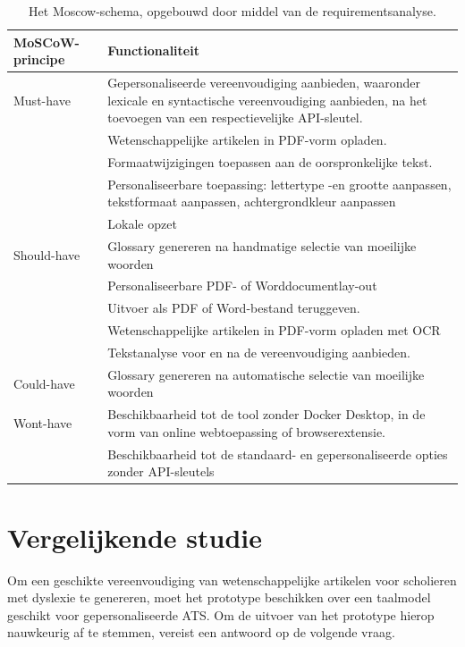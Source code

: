 \begin{center}
	\begin{table}[H]
	\begin{tabular}{ | m{4cm} | m{11cm} | } 
		\hline
		\textbf{MoSCoW-principe} & Functionaliteit \\
		\hline
		Must-have & Gepersonaliseerde vereenvoudiging aanbieden, waaronder lexicale en syntactische vereenvoudiging aanbieden, na het toevoegen van een respectievelijke API-sleutel. \\
		& Wetenschappelijke artikelen in PDF-vorm opladen. \\
		& Formaatwijzigingen toepassen aan de oorspronkelijke tekst. \\
		& Personaliseerbare toepassing: lettertype -en grootte aanpassen, tekstformaat aanpassen, achtergrondkleur aanpassen \\
		& Lokale opzet \\
		\hline
		Should-have & Glossary genereren na handmatige selectie van moeilijke woorden \\
		& Personaliseerbare PDF- of Worddocumentlay-out \\
		& Uitvoer als PDF of Word-bestand teruggeven. \\
		& Wetenschappelijke artikelen in PDF-vorm opladen met OCR \\
		& Tekstanalyse voor en na de vereenvoudiging aanbieden. \\
		\hline
		Could-have & Glossary genereren na automatische selectie van moeilijke woorden \\
		\hline
		Wont-have & Beschikbaarheid tot de tool zonder Docker Desktop, in de vorm van online webtoepassing of browserextensie. \\
		& Beschikbaarheid tot de standaard- en gepersonaliseerde opties zonder API-sleutels \\
		\hline
	\end{tabular}
	\caption{Het Moscow-schema, opgebouwd door middel van de requirementsanalyse.}
	\label{img:moscow-table}
	\end{table}
\end{center}

\section{Vergelijkende studie}
\label{sec:vergelijkende-studie}

Om een geschikte vereenvoudiging van wetenschappelijke artikelen voor scholieren met dyslexie te genereren, moet het prototype beschikken over een taalmodel geschikt voor gepersonaliseerde ATS. Om de uitvoer van het prototype hierop nauwkeurig af te stemmen, vereist een antwoord op de volgende vraag.

